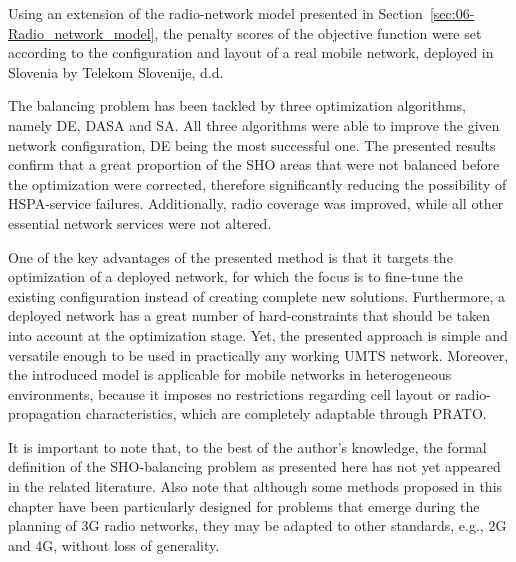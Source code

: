 \noindent Using an extension of the radio-network model presented
in Section~\ref{sec:06-Radio_network_model}, the penalty scores
of the objective function were set according to the configuration
and layout of a real mobile network, deployed in Slovenia by Telekom
Slovenije, d.d. 

The balancing problem has been tackled by three optimization algorithms,
namely DE, DASA and SA. All three algorithms were able to improve
the given network configuration, DE being the most successful one.
The presented results confirm that a great proportion of the SHO areas
that were not balanced before the optimization were corrected, therefore
significantly reducing the possibility of HSPA-service failures. Additionally,
radio coverage was improved, while all other essential network services
were not altered.

One of the key advantages of the presented method is that it targets
the optimization of a deployed network, for which the focus is to
fine-tune the existing configuration instead of creating complete
new solutions. Furthermore, a deployed network has a great number
of hard-constraints that should be taken into account at the optimization
stage. Yet, the presented approach is simple and versatile enough
to be used in practically any working UMTS network. Moreover, the
introduced model is applicable for mobile networks in heterogeneous
environments, because it imposes no restrictions regarding cell layout
or radio-propagation characteristics, which are completely adaptable
through PRATO.

It is important to note that, to the best of the author's knowledge,
the formal definition of the SHO-balancing problem as presented here
has not yet appeared in the related literature. Also note that although
some methods proposed in this chapter have been particularly designed
for problems that emerge during the planning of 3G radio networks,
they may be adapted to other standards, e.g., 2G and 4G, without loss
of generality.
